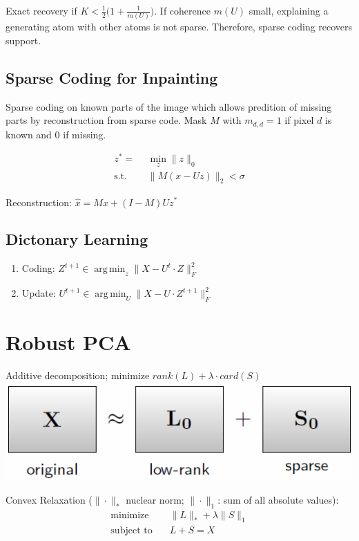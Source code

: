 \documentclass[a4paper,landscape,10pt]{article}
\newlength{\wideitemsep}
\let\olditem\item
\renewcommand{\item}{\setlength{\itemsep}{\wideitemsep}\olditem}
\DeclareMathOperator*{\argmin}{arg\,min}
\begin{document}
\begin{multicols}{4}
Exact recovery if $K < \frac{1}{2}\big( 1 + \frac{1}{m(U)}\big)$. If coherence
$m(U)$ small, explaining a generating atom with other atoms is not sparse.
Therefore, sparse coding recovers support.

\subsection{Sparse Coding for Inpainting}
Sparse coding on known parts of the image which allows predition of missing
parts by reconstruction from sparse code. Mask $M$ with $m_{d,d} = 1$ if pixel
$d$ is known and $0$ if missing.

\begin{align*}
    z^* =                &\min_z \|z\|_0 \\
    \text{s.t. } \quad   &\|M(x - Uz)\|_2 < \sigma
\end{align*}

Reconstruction: $\hat{x} = Mx + (I-M)Uz^*$

\subsection{Dictonary Learning}
\begin{enumerate}
    \item Coding: $Z^{t+1} \in \argmin_z \| X - U^t \cdot Z \|_F^2$
    \item Update: $U^{t+1} \in \argmin_U \|X - U \cdot Z^{t+1}\|_F^2$
\end{enumerate}

\section{Robust PCA}
Additive decomposition; minimize $rank(L) + \lambda \cdot card(S)$ \\
\includegraphics[width=0.9\linewidth]{rpca}

Convex Relaxation ($\|\cdot\|_*$ nuclear norm; $\|\cdot\|_1$: sum of all
absolute values):
\begin{align*}
    \text{minimize} \quad   & \|L\|_* + \lambda \|S\|_1 \\
    \text{subject to} \quad & L + S = X
\end{align*}


\end{multicols}
\end{document}
